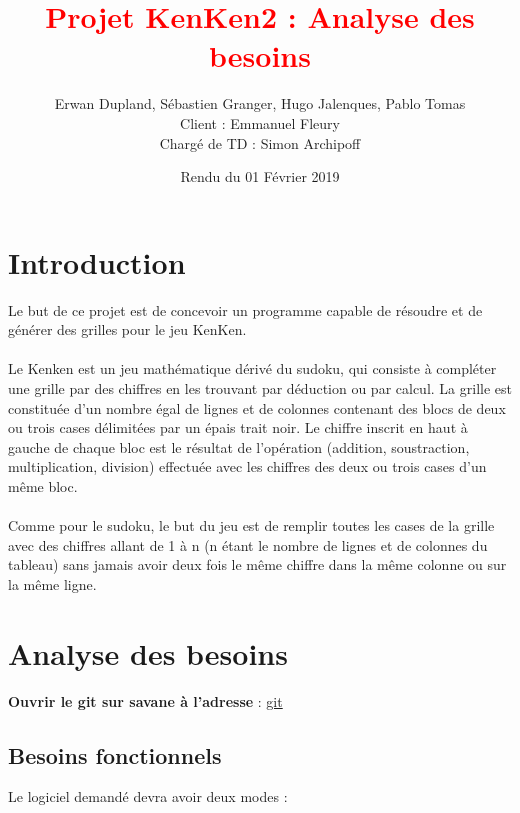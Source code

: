 \documentclass[1]{report}
\title{\textcolor{red}{Projet KenKen2 : Analyse des besoins}}
\author{Erwan Dupland, Sébastien Granger, Hugo Jalenques, Pablo Tomas
\\ Client : Emmanuel Fleury \\ Chargé de TD : Simon Archipoff}
\date{Rendu du 01 Février 2019}
\begin{document}
\chapterfont{\color{red}}
\sectionfont{\color{blue}}

\maketitle

\chapter{Introduction}

		Le but de ce projet est de concevoir un programme capable de résoudre et de générer des grilles pour le jeu KenKen. \\~\\

		Le Kenken est un jeu mathématique dérivé du sudoku, qui consiste à compléter une grille par des chiffres en les trouvant par déduction ou par calcul. La grille est constituée d'un nombre égal de lignes et de colonnes contenant des blocs de deux ou trois cases délimitées par un épais trait noir. Le chiffre inscrit en haut à gauche de chaque bloc est le résultat de l'opération (addition, soustraction, multiplication, division) effectuée avec
		les chiffres des deux ou trois cases d'un même bloc.\\~\\

		Comme pour le sudoku, le but du jeu est de remplir toutes les cases de la grille avec des chiffres allant de 1 à n (n étant le nombre de lignes et de
		colonnes du tableau) sans jamais avoir deux fois le même chiffre dans la même colonne ou sur la même ligne.

\chapter{Analyse des besoins}

    \begin{center}

        \textbf{Ouvrir le git sur savane à l'adresse} : \href{https://services.emi.u-bordeaux.fr/projet/savane}{git}

    \end{center}

    \section{Besoins fonctionnels}

        Le logiciel demandé devra avoir deux modes : \\
\end{document}
